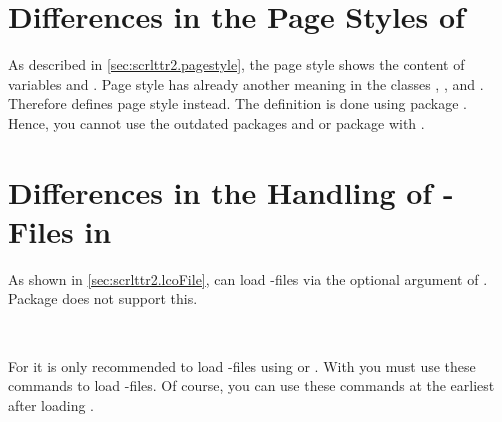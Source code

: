 \section{Differences in the Page Styles of }
\label{sec:scrlttr2-experts.pagestyleatscrletter}

As described in \autoref{sec:scrlttr2.pagestyle}, the page style
 shows the content of variables  and
. Page style  has already another
meaning in the \KOMAScript{} classes , , and
. Therefore  defines page
style  instead. The
definition is done using package
. Hence,
you cannot use the outdated packages 
and  or package 
with .%
%


\section{Differences in the Handling of -Files in }
\label{sec:scrlttr2-experts.lcoatscrletter}
%
%

As shown in
\autoref{sec:scrlttr2.lcoFile},  can load -files via
the optional argument of . Package 
does not support this.

\begin{Declaration}
  \\
\end{Declaration}
%
%
For  it is only recommended to load -files using
 or . With 
you must use these commands to load -files. Of course, you can use
these commands at the earliest after loading .%
%
%
%
%
%
%
%
%


